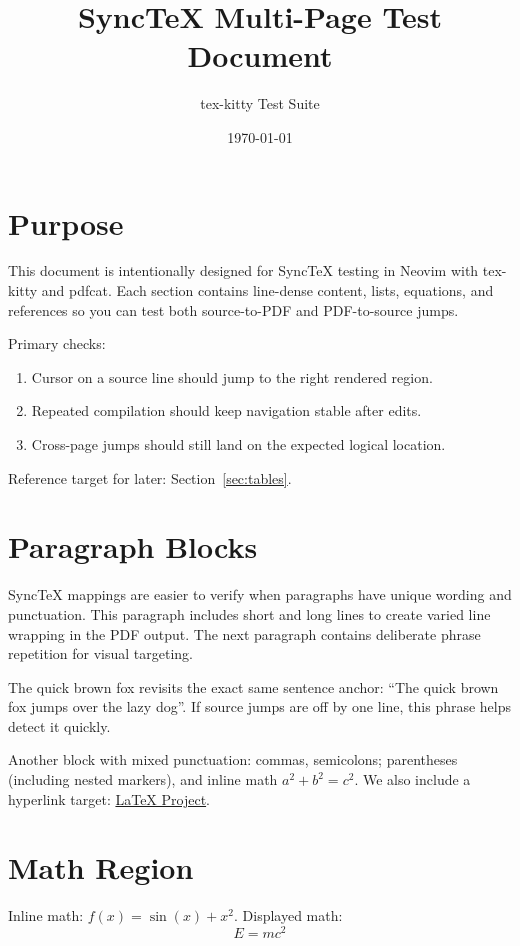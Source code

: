 \documentclass{article}
\title{SyncTeX Multi-Page Test Document}
\author{tex-kitty Test Suite}
\date{\today}
\begin{document}
\maketitle
\tableofcontents
\newpage

\section{Purpose}
\label{sec:purpose}
This document is intentionally designed for SyncTeX testing in Neovim with tex-kitty and pdfcat.
Each section contains line-dense content, lists, equations, and references so you can test both
source-to-PDF and PDF-to-source jumps.

Primary checks:
\begin{enumerate}
  \item Cursor on a source line should jump to the right rendered region.
  \item Repeated compilation should keep navigation stable after edits.
  \item Cross-page jumps should still land on the expected logical location.
\end{enumerate}

Reference target for later: Section~\ref{sec:tables}.

\newpage
\section{Paragraph Blocks}
\label{sec:paragraphs}
SyncTeX mappings are easier to verify when paragraphs have unique wording and punctuation.
This paragraph includes short and long lines to create varied line wrapping in the PDF output.
The next paragraph contains deliberate phrase repetition for visual targeting.

The quick brown fox revisits the exact same sentence anchor:
``The quick brown fox jumps over the lazy dog''.
If source jumps are off by one line, this phrase helps detect it quickly.

Another block with mixed punctuation: commas, semicolons; parentheses (including nested markers),
and inline math $a^2+b^2=c^2$.
We also include a hyperlink target: \href{https://www.latex-project.org}{LaTeX Project}.

\newpage
\section{Math Region}
\label{sec:math}
Inline math: $f(x)=\sin(x)+x^2$.
Displayed math:
\begin{equation}
\label{eq:energy}
E = mc^2
\end{equation}
\end{document}

